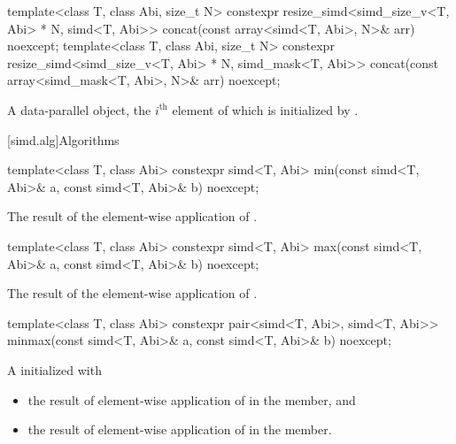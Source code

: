 \begin{itemdecl}
  template<class T, class Abi, size_t N>
    constexpr resize_simd<simd_size_v<T, Abi> * N, simd<T, Abi>>
      concat(const array<simd<T, Abi>, N>& arr) noexcept;
  template<class T, class Abi, size_t N>
    constexpr resize_simd<simd_size_v<T, Abi> * N, simd_mask<T, Abi>>
      concat(const array<simd_mask<T, Abi>, N>& arr) noexcept;
\end{itemdecl}

\begin{itemdescr}
  \pnum\returns
  A data-parallel object, the $i^\text{th}$ element of which is initialized by .
\end{itemdescr}

[simd.alg]{Algorithms}

\begin{itemdecl}
template<class T, class Abi> constexpr simd<T, Abi> min(const simd<T, Abi>& a, const simd<T, Abi>& b) noexcept;
\end{itemdecl}

\begin{itemdescr}
  \pnum\returns
  The result of the element-wise application of  \foralli.
\end{itemdescr}

\begin{itemdecl}
template<class T, class Abi> constexpr simd<T, Abi> max(const simd<T, Abi>& a, const simd<T, Abi>& b) noexcept;
\end{itemdecl}

\begin{itemdescr}
  \pnum\returns
  The result of the element-wise application of  \foralli.
\end{itemdescr}

\begin{itemdecl}
template<class T, class Abi>
  constexpr pair<simd<T, Abi>, simd<T, Abi>> minmax(const simd<T, Abi>& a, const simd<T, Abi>& b) noexcept;
\end{itemdecl}

\begin{itemdescr}
  \pnum\returns
  A  initialized with
  \begin{itemize}
    \item the result of element-wise application of  \foralli{} in the  member, and
    \item the result of element-wise application of  \foralli{} in the  member.
  \end{itemize}
\end{itemdescr}

